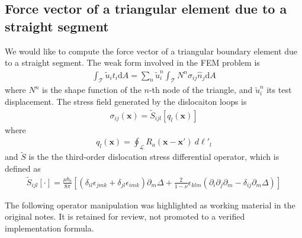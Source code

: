 \subsection{Force vector of a triangular element due to a straight segment}
We would like to compute the force vector of a triangular boundary element due to a straight segment. The weak form involved in the FEM problem is
\begin{align}
\int_\mathcal{T}\tilde u_i t_i \text{d}A=\sum_n \tilde u^n_i\int_\mathcal{T}N^n \sigma_{ij}\hat{n}_j \text{d}A
\end{align}
where $N^n$ is the shape function of the $n$-th node of the triangle, and $\tilde u^n_i$ its test displacement. 
The stress field generated by the dislocaiton loops is
\begin{align}
\sigma_{ij}(\bm x)=\tilde{S}_{ijl}\left[q_l(\bm x)\right]
\end{align}
where 
\begin{align}
q_l(\bm x)=\oint_\mathcal{L}R_a(\bm x-\bm x')\ d\ell'_l
\end{align}
and $\tilde{S}$ is the the third-order dislocation stress differential operator, which is defined as
\begin{align}
\tilde{S}_{ijl}[\cdot]=\frac{\mu b_k}{8\pi}\left[\left(\delta_{il}\epsilon_{jmk}+\delta_{jl}\epsilon_{imk}\right)\partial_m\Delta+\frac{2}{1-\nu}\epsilon_{klm}\left(\partial_{i}\partial_j\partial_m-\delta_{ij}\partial_m\Delta\right)\right]
\end{align}
\begin{draftnote}The following operator manipulation was highlighted as working material in the original notes. It is retained for review, not promoted to a verified implementation formula.\end{draftnote}
